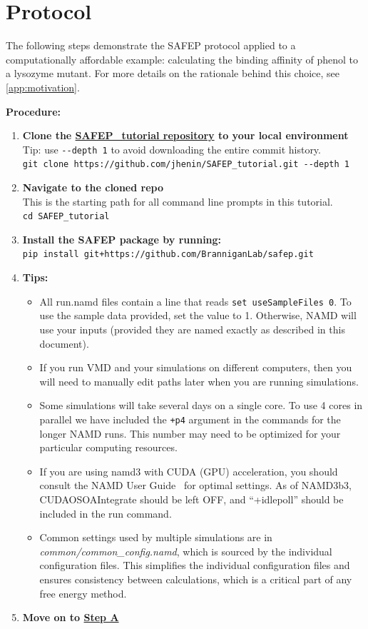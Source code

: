 \documentclass[9pt,tutorial,pubversion]{Styling/livecoms}
\newcommand{\filepath}[1]{\textit{#1}}
\newcommand{\textInput}[1]{\texttt{#1}}
\begin{document}
\section{Protocol} \label{sec:protocol}
\vspace{0.5em}

The following steps demonstrate the SAFEP protocol applied to a computationally affordable example: calculating the binding affinity of phenol to a lysozyme mutant.
For more details on the rationale behind this choice, see \ref{app:motivation}.

\textbf{Procedure:}
\begin{enumerate}
    \item \textbf{Clone the \href{https://github.com/jhenin/SAFEP_tutorial}{SAFEP\_tutorial repository} to your local environment} Tip: use \textInput{-{}-depth 1} to avoid downloading the entire commit history. \\
    \textInput{git clone https://github.com/jhenin/SAFEP\_tutorial.git -{}-depth 1}
    \item \textbf{Navigate to the cloned repo}\\
    This is the starting path for all command line prompts in this tutorial. \\
    \textInput{cd SAFEP\_tutorial}
    \item \textbf{Install the SAFEP package by running:}\\
    \textInput{pip install git+https://github.com/BranniganLab/safep.git}
    \item \textbf{Tips:} 
    \begin{itemize}
    \item All run.namd files contain a line that reads \textInput{set useSampleFiles 0}. To use the sample data provided, set the value to 1. Otherwise, NAMD will use your inputs (provided they are named exactly as described in this document).
    \item If you run VMD and your simulations on different computers, then you will need to manually edit paths later when you are running simulations. 
    \item Some simulations will take several days on a single core. To use 4 cores in parallel we have included the \textInput{+p4} argument in the commands for the longer NAMD runs. This number may need to be optimized for your particular computing resources.
    \item If you are using namd3 with CUDA (GPU) acceleration, you should consult the NAMD User Guide~\cite{Bernardi2020} for optimal settings. As of NAMD3b3, CUDAOSOAIntegrate should be left OFF, and ``+idlepoll'' should be included in the run command.
    \item Common settings used by multiple simulations are in \filepath{common/common\_config.namd}, which is sourced by the individual configuration files. This simplifies the individual configuration files and ensures consistency between calculations, which is a critical part of any free energy method.
    \end{itemize}
    \item \textbf{Move on to \hyperref[step:equilibrium]{Step A}}
\end{enumerate}
\end{document}
